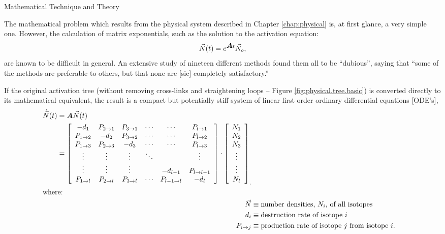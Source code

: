 \begin{chapter}{Mathematical Technique and Theory}

The mathematical problem which results from the physical system
described in Chapter \ref{chap:physical} is, at first glance, a very
simple one.  However, the calculation of matrix exponentials, such as
the solution to the activation equation:
$$\vec{N}(t) = e^{\mbox{\boldmath $A$} t} \vec{N}_o,$$
are known to be difficult in
general.  An extensive study of nineteen different methods found them
all to be ``dubious'', saying that ``some of the methods are
preferable to others, but that none are [sic] completely
satisfactory.''

If the original activation tree (without removing cross-links and
straightening loops -- Figure \ref{fig:physical.tree.basic}) is
converted directly to its mathematical equivalent, the result is a
compact but potentially stiff system of linear first order ordinary
differential equations [ODE's],
\begin{align}
  \begin{split}
    \dot{\vec{N}}(t) &= \mbox{\boldmath $A$}\vec{N}(t)\\
    &= \left [
      \begin{array}{cccccc}
        -d_1 & P_{2\rightarrow 1} & P_{3\rightarrow 1} & \cdots & \cdots & P_{l\rightarrow 1}\\
        P_{1\rightarrow 2} & -d_2 & P_{3\rightarrow 2} & \cdots & \cdots & P_{l\rightarrow 2}\\
        P_{1\rightarrow 3} & P_{2\rightarrow 3} & -d_3 & \cdots & \cdots & P_{l\rightarrow 3}\\
        \vdots & \vdots & \vdots & \ddots &  & \vdots\\
        \vdots & \vdots & \vdots & & -d_{l-1} & P_{l\rightarrow l-1}\\
        P_{1\rightarrow l} & P_{2\rightarrow l} & P_{3\rightarrow l} & \cdots & P_{l-1\rightarrow l} & -d_l
      \end{array} \right ] \cdot \left [
      \begin{array}{c}
        N_1 \\ N_2 \\ N_3 \\ \vdots \\ \vdots \\ N_l
      \end{array} \right ]_,
  \end{split}\label{eq:math.intro.explicit}\\
  \intertext{where:}
  \vec{N} &\equiv \text{number densities, $N_i$, of all isotopes}\notag \\
  d_i &\equiv \text{destruction rate of isotope $i$}\notag \\
  P_{i\rightarrow j} &\equiv \text{production rate of isotope $j$ from isotope $i$.}\notag
\end{align}


\end{chapter}
